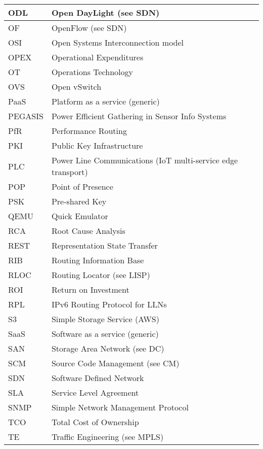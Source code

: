 \begin{longtable}{ll}
  ODL		&		Open DayLight (see SDN)		\\ \midrule
  OF		&		OpenFlow (see SDN)		\\ \midrule
  OSI		&		Open Systems Interconnection model		\\ \midrule
  OPEX		&		Operational Expenditures		\\ \midrule
  OT		&		Operations Technology		\\ \midrule
  OVS		&		Open vSwitch		\\ \midrule
  PaaS		&		Platform as a service (generic)		\\ \midrule
  PEGASIS	&		Power Efficient Gathering in Sensor Info Systems		\\ \midrule
  PfR		&		Performance Routing		\\ \midrule
  PKI		&		Public Key Infrastructure		\\ \midrule
  PLC		&		Power Line Communications (IoT multi-service edge transport)		\\ \midrule
  POP		&		Point of Presence		\\ \midrule
  PSK		&		Pre-shared Key		\\ \midrule
  QEMU		&		Quick Emulator		\\ \midrule
  RCA		&		Root Cause Analysis		\\ \midrule
  REST		&		Representation State Transfer		\\ \midrule
  RIB		&		Routing Information Base		\\ \midrule
  RLOC		&		Routing Locator (see LISP)		\\ \midrule
  ROI		&		Return on Investment		\\ \midrule
  RPL		&		IPv6 Routing Protocol for LLNs		\\ \midrule
  S3		&		Simple Storage Service (AWS)		\\ \midrule
  SaaS		&		Software as a service (generic)		\\ \midrule
  SAN		&		Storage Area Network (see DC)		\\ \midrule
  SCM		&		Source Code Management (see CM)		\\ \midrule
  SDN		&		Software Defined Network		\\ \midrule
  SLA		&		Service Level Agreement		\\ \midrule
  SNMP		&		Simple Network Management Protocol		\\ \midrule
  TCO		&		Total Cost of Ownership		\\ \midrule
  TE		&		Traffic Engineering (see MPLS)		\\ \midrule

\end{longtable}
